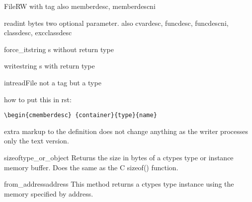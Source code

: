 \begin{ctypedesc}[ftag]{FileRW}
with tag
also memberdesc, memberdescni
\end{ctypedesc}

\begin{funcdescni}{read}{int bytes }
two optional parameter.
also cvardesc, funcdesc, funcdescni, classdesc, excclassdesc
\end{funcdescni}

\begin{methoddesc}{force_it}{string s}
without return type
\end{methoddesc}

\begin{methoddescni}[bool]{write}{string s}
with return type
\end{methoddescni}

\begin{cfuncdesc}{int}{read}{File}
not a tag but a type
\end{cfuncdesc}

how to put this in rst:
\begin{verbatim}
\begin{cmemberdesc} {container}{type}{name}
\end{verbatim}

extra markup to the definition does not change anything as the writer processes
only the text version.

\begin{funcdesc}{sizeof}{type_or_object}
Returns the size in bytes of a ctypes type or instance memory
buffer.  Does the same as the C sizeof() function.
\end{funcdesc}

\begin{methoddesc}{from_address}{address}
This method returns a ctypes type instance using the memory
specified by address.
\end{methoddesc}


